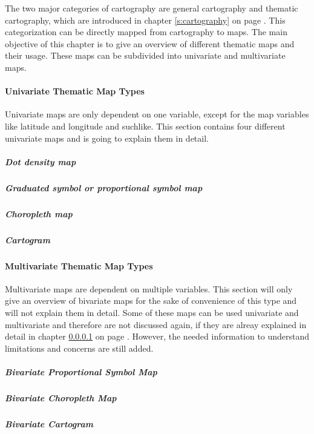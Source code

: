 The two major categories of cartography are general cartography and thematic cartography, which are introduced in chapter \ref{s:cartography} on page \pageref{s:cartography}. This categorization can be directly mapped from cartography to maps. The main objective of this chapter is to give an overview of different thematic maps and their usage. These maps can be subdivided into univariate and multivariate maps.

\paragraph{Univariate Thematic Map Types}
\label{s:univariate-maps}

Univariate maps are only dependent on one variable, except for the map variables like latitude and longitude and suchlike. This section contains four different univariate maps and is going to explain them in detail.

\subparagraph{Dot density map}
\label{s:dot}


\subparagraph{Graduated symbol or proportional symbol map}


\subparagraph{Choropleth map}

\label{s:choropleth}

\subparagraph{Cartogram}


\paragraph{Multivariate Thematic Map Types}
Multivariate maps are dependent on multiple variables. This section will only give an overview of bivariate maps for the sake of convenience of this type and will not explain them in detail. Some of these maps can be used univariate and multivariate and therefore are not discussed again, if they are alreay explained in detail in chapter \ref{s:univariate-maps} on page \pageref{s:univariate-maps}. However, the needed information to understand limitations and concerns are still added.

\subparagraph{Bivariate Proportional Symbol Map}


\subparagraph{Bivariate Choropleth Map}


\subparagraph{Bivariate Cartogram}
